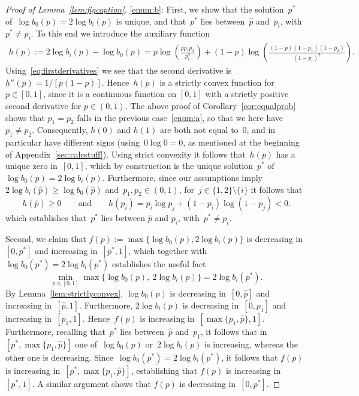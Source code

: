 \documentclass{article}
\newcommand\lrpar[1]{\left(#1\right)}
\newcommand{\ps}{\hat{p}}
\newcommand{\pz}{p^*}
\newcommand\bigcpar[1]{\bigl\{#1\bigr\}}
\begin{document}
\begin{proof}[Proof of Lemma~\ref{lem:figcaption}]
\ref{enum:b}: 
First, we show that the solution~$\pz$ of~$\log b_0(p)=2\log b_i(p)$ is unique, and that~$\pz$ lies between~$\ps$ and~$p_i$, with~$\pz \neq p_i$. 
To this end we introduce the auxiliary function
\begin{align*}
    h(p):=2\log b_i(p)-\log {b_0}(p)= p \log \lrpar{\frac{pp_1p_2}{p_i^2}}+ (1-p)\log\lrpar{\frac{(1-p)(1-p_1)(1-p_2)}{(1-p_i)^2}}.
\end{align*}
Using~\eqref{eq:firstderivatives} we see that the second derivative is $h''(p)=1/[p(1-p)]$. 
Hence~$h(p)$ is a strictly convex function for~$p\in [0,1]$, 
since it is a continuous function on $[0,1]$ with a strictly positive second derivative for $p \in (0,1)$.
The above proof of Corollary~\ref{cor:equalprob} shows that $p_1=p_2$ falls in the previous case~\ref{enum:a}, so that we here have~$p_1 \neq p_2$. 
Consequently, $h(0)$ and $h(1)$ are both not equal to~$0$, and 
in particular have different signs (using~$0\log 0=0$, as mentioned at the beginning of Appendix~\ref{sec:calcstuff}). 
Using strict convexity it follows that~$h(p)$ has a unique zero in~$[0,1]$, which by construction is the unique solution~$\pz$ of~$\log b_0(p)=2\log b_i(p)$. 
Furthermore, since our assumptions imply $2\log b_i(\ps) \ge \log b_0(\ps)$ and~$p_1,p_2 \in (0,1)$, for~$j \in \{1,2\} \setminus \{i\}$ it follows that
\begin{equation*}h(\ps)\ge 0 \qquad\text{and} \qquad h(p_i)=p_i\log p_j+(1-p_i) \log (1-p_j)<0.
\end{equation*}
which establishes that~$\pz$ lies between $\ps$ and $p_i$, with~$\pz \neq p_i$. 

Second, we claim that $f(p):=\max\{\log b_0(p), 2\log b_i(p)\}$ is decreasing in~$[0,\pz]$ and increasing in~$[\pz,1]$, which together with~$\log b_0(\pz)=2\log b_i(\pz)$ establishes the useful fact 
\begin{equation}\label{eq:f:optimizer}
\min_{p\in [0,1]}\max\bigcpar{\log b_0(p),\: 2\log b_i(p)}= 2\log b_i(\pz).
\end{equation}
By Lemma~\ref{lem:strictlyconvex}, $\log b_0(p)$ is decreasing in~$[0,\ps]$ and increasing in~$[\ps,1]$. 
Furthermore, $2\log b_i(p)$ is decreasing in~$[0,p_1]$ and increasing in~$[p_1,1]$. 
Hence~$f(p)$ is  increasing in~$[\max\{p_1,\ps\}, 1]$.
Furthermore, recalling that~$\pz$ lies between~$\ps$ and~$p_1$, it follows that in~$[\pz, \max\{p_1,\ps\}]$  one of~$\log b_0(p)$ or~$2\log b_i(p)$ is increasing, whereas the other one is decreasing. 
Since~$\log b_0(\pz) = 2\log b_i(\pz)$, it follows that $f(p)$ is increasing in~$[\pz, \max\{p_1,\ps\}]$, 
establishing that $f(p)$ is  increasing in~$[\pz,1]$. 
A similar argument shows that $f(p)$ is decreasing in~$[0,\pz]$.  


\end{proof}
\end{document}
